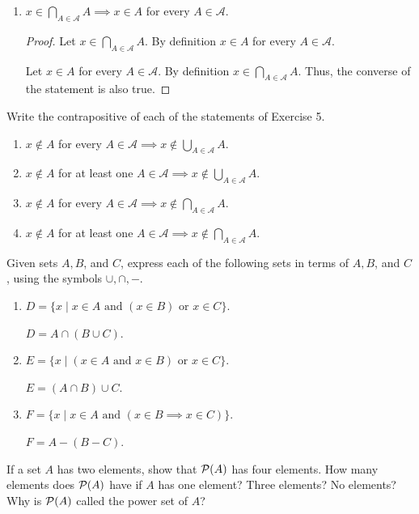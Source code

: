 \documentclass[12pt]{article}
\begin{document}
\begin{enumerate}[label=(\alph*)]
	\item $x \in \bigcap_{A \in \mathcal{A}} A \implies x \in A$ for every $A \in \mathcal{A}$.
	
	\begin{proof}
		Let $x \in \bigcap_{A \in \mathcal{A}} A$. By definition $x \in A$ for every
		$A \in \mathcal{A}$.
		
		Let $x \in A$ for every $A \in \mathcal{A}$. By definition 
		$x \in \bigcap_{A \in \mathcal{A}} A$. Thus, the converse of the statement is 
		also true.
	\end{proof}
\end{enumerate}

 Write the contrapositive of each of the statements of Exercise 5.
\begin{enumerate}[label=(\alph*)]
	\item $x \notin A$ for every $A \in \mathcal{A} \implies 
	x \notin \bigcup_{A \in \mathcal{A}} A$.
	\item $x \notin A$ for at least one $A \in \mathcal{A} \implies x \notin 
	\bigcup_{A \in \mathcal{A}} A$.
	\item $x \notin A$ for every $A \in \mathcal{A} \implies 
	x \notin \bigcap_{A \in \mathcal{A}} A$.
	\item $x \notin A$ for at least one $A \in \mathcal{A} \implies 
	x \notin \bigcap_{A \in \mathcal{A}} A$.
\end{enumerate}

\pagebreak
{} Given sets $A, B$, and $C$, express each of the following sets in terms of 
$A, B$, and $C$, using the symbols $\cup, \cap, -$.
\begin{enumerate}[label=(\alph*)]
	\item $D = \{x \mid x \in A \text{ and } (x \in B) \text{ or } x \in C\}$.
	
	$D = A \cap (B \cup C)$.
	\item $E = \{x \mid (x \in A \text{ and } x \in B) \text{ or } x \in C\}$.
	
	$E = (A \cap B) \cup C$.
	\item $F = \{x \mid x \in A \text{ and } (x \in B \implies x \in C)\}$.
	
	$F = A - (B - C)$.
\end{enumerate}

 If a set $A$ has two elements, show that $\mathcal{P}(A)$ has four elements.
How many elements does $\mathcal{P}(A)$ have if $A$ has one element? Three elements? 
No elements? Why is $\mathcal{P}(A)$ called the power set of $A$?
\end{document}
